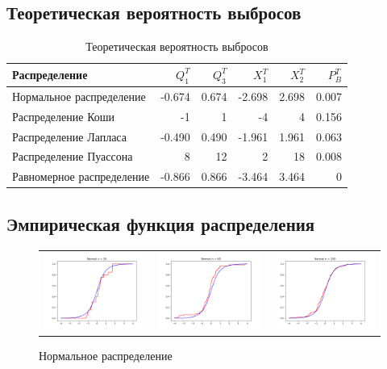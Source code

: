 \subsection{Теоретическая вероятность выбросов}
\begin{table}[H]
	\centering
	\begin{tabular}[t]{lrrrrr}
		\hline
		Распределение   &      $Q_1^T$	& $Q_3^T$ & $X_1^T$ & $X_2^T$ & $P_B^T$	\\
		\hline
		Нормальное распределение 	& -0.674& 0.674 & -2.698 	&  2.698 	& 0.007 \\
		Распределение Коши 			& -1	& 1		&  -4		& 4			& 0.156 \\
		Распределение Лапласа 		&-0.490	& 0.490	& -1.961	& 1.961		& 0.063\\
		Распределение Пуассона 		& 8		& 12	& 2			& 18		& 0.008 \\
		Равномерное распределение 	&-0.866 & 0.866	& -3.464 	& 3.464 	& 0	\\
		
		\hline
	\end{tabular}
	\caption{Теоретическая вероятность выбросов}
	\label{tab:normal}
\end{table}


\subsection{Эмпирическая функция распределения}
	\begin{figure}[H]
		\centering
		\begin{tabular}{ccc}
			\includegraphics[width=55mm, height =0.25\textheight]{pics/emp_n_20.png}
			&
			\includegraphics[width=55mm, height =0.25\textheight]{pics/emp_n_60.png}
			&
			\includegraphics[width=55mm, height =0.25\textheight]{pics/emp_n_100.png}
		\end{tabular}
		\caption{Нормальное распределение}
		\label{fig:normal}
	\end{figure}

